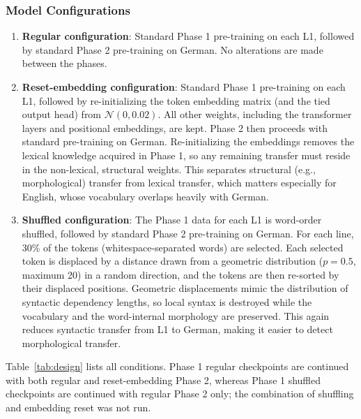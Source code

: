 \documentclass[11pt]{article}
\begin{document}
\subsubsection{Model Configurations}
\begin{enumerate}
    \item \textbf{Regular configuration}: Standard Phase 1 pre-training on each L1, followed by standard Phase 2 pre-training on German. No alterations are made between the phases.
    \item \textbf{Reset-embedding configuration}: Standard Phase 1 pre-training on each L1, followed by re-initializing the token embedding matrix (and the tied output head) from $\mathcal{N}(0, 0.02)$. All other weights, including the transformer layers and positional embeddings, are kept. Phase 2 then proceeds with standard pre-training on German. Re-initializing the embeddings removes the lexical knowledge acquired in Phase 1, so any remaining transfer must reside in the non-lexical, structural weights. This separates structural (e.g., morphological) transfer from lexical transfer, which matters especially for English, whose vocabulary overlaps heavily with German.
    \item \textbf{Shuffled configuration}: The Phase 1 data for each L1 is word-order shuffled, followed by standard Phase 2 pre-training on German. For each line, 30\% of the tokens (whitespace-separated words) are selected. Each selected token is displaced by a distance drawn from a geometric distribution ($p = 0.5$, maximum 20) in a random direction, and the tokens are then re-sorted by their displaced positions. Geometric displacements mimic the distribution of syntactic dependency lengths, so local syntax is destroyed while the vocabulary and the word-internal morphology are preserved. This again reduces syntactic transfer from L1 to German, making it easier to detect morphological transfer.
\end{enumerate}


Table~\ref{tab:design} lists all conditions. Phase 1 regular checkpoints are continued with both regular and reset-embedding Phase 2, whereas Phase 1 shuffled checkpoints are continued with regular Phase 2 only; the combination of shuffling and embedding reset was not run.
\end{document}
